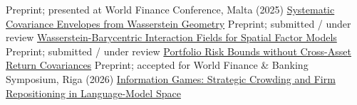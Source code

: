\begin{cventries}
  \cventry
  {Preprint; presented at World Finance Conference, Malta (2025)}
  {\href{https://arxiv.org/abs/2410.23447}{Systematic Covariance
  Envelopes from Wasserstein Geometry}}
  {}{}{}
  \cventry
  {Preprint; submitted / under review}
  {\href{https://arxiv.org/abs/2608.29669}{Wasserstein-Barycentric
  Interaction Fields for Spatial Factor Models}}
  {}{}{}
  \cventry
  {Preprint; submitted / under review}
  {\href{https://arxiv.org/abs/2608.29692}{Portfolio Risk Bounds
  without Cross-Asset Return Covariances}}
  {}{}{}
  \cventry
  {Preprint; accepted for World Finance \& Banking Symposium, Riga (2026)}
  {\href{https://arxiv.org/abs/2609.37820}{Information Games:
  Strategic Crowding and Firm Repositioning in Language-Model Space}}
  {}{}{}
\end{cventries}
